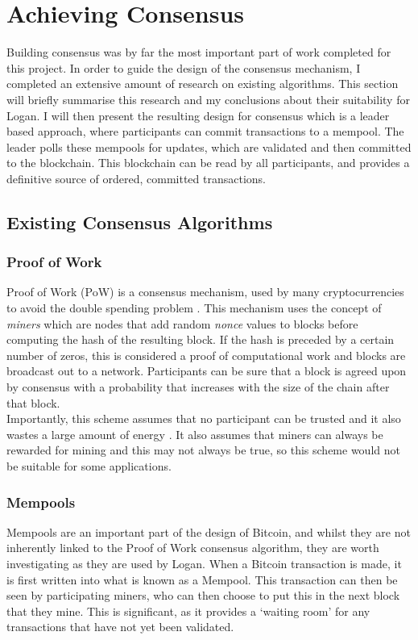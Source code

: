 \documentclass[12pt,a4paper,twoside,openright]{report}
\begin{document}
	\section{Achieving Consensus}\label{sec:consensus}
	Building consensus was by far the most important part of work completed for this project. 
	In order to guide the design of the consensus mechanism, I completed an extensive amount of research on existing algorithms.
	This section will briefly summarise this research and my conclusions about their suitability for Logan.
	I will then present the resulting design for consensus which is a leader based approach, where participants can commit transactions to a mempool.
	The leader polls these mempools for updates, which are validated and then committed to the blockchain.
	This blockchain can be read by all participants, and provides a definitive source of ordered, committed transactions.

	\subsection{Existing Consensus Algorithms} 
	\subsubsection*{Proof of Work} 
	Proof of Work (PoW) is a consensus mechanism, used by many cryptocurrencies to avoid the double spending problem \parencite{Bitcoin}. 
	This mechanism uses the concept of \textit{miners} which are nodes that add random \textit{nonce} values to blocks before computing the hash of the resulting block.
	If the hash is preceded by a certain number of zeros, this is considered a proof of computational work and blocks are broadcast out to a network.
	Participants can be sure that a block is agreed upon by consensus with a probability that increases with the size of the chain after that block. \\

	Importantly, this scheme assumes that no participant can be trusted 
	and it also wastes a large amount of energy \parencite{BitcoinEnergy}.
	It also assumes that miners can always be rewarded for mining and this may not always be true, so this scheme would not be suitable for some applications.
	
	\subsubsection*{Mempools}
	Mempools are an important part of the design of Bitcoin, and whilst they are not inherently linked to the Proof of Work consensus algorithm, they are worth investigating as they are used by Logan.
	When a Bitcoin transaction is made, it is first written into what is known as a Mempool. 
	This transaction can then be seen by participating miners, who can then choose to put this in the next block that they mine. 
	This is significant, as it provides a `waiting room' for any transactions that have not yet been validated.  
\end{document}
